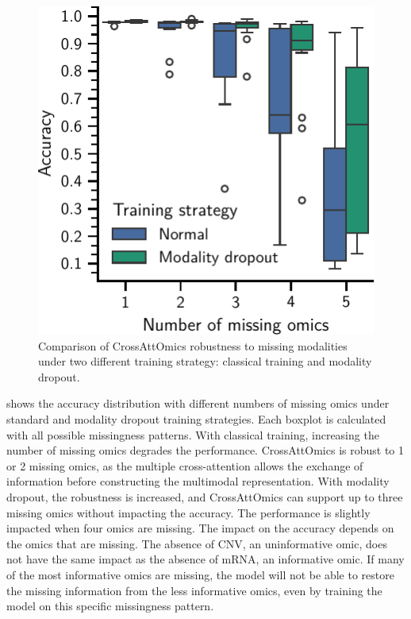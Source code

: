 \documentclass[../main.tex]{subfiles}
\begin{document}
		\begin{figure}
			\centering
			\includegraphics{robustness_missing_modalities_dropout.pdf}
			\caption[CrossAttOmics robustness to missing modalities]{Comparison of CrossAttOmics robustness to missing modalities under two different training strategy: classical training and modality dropout.}\label{fig:modality_dropout}
		\end{figure}
		 shows the accuracy distribution with different numbers of missing omics under standard and modality dropout training strategies.
		Each boxplot is calculated with all possible missingness patterns.
		With classical training, increasing the number of missing omics degrades the performance.
		CrossAttOmics is robust to 1 or 2 missing omics, as the multiple cross-attention allows the exchange of information before constructing the multimodal representation.
		With modality dropout, the robustness is increased, and CrossAttOmics can support up to three missing omics without impacting the accuracy.
		The performance is slightly impacted when four omics are missing.
		The impact on the accuracy depends on the omics that are missing.
		The absence of CNV, an uninformative omic, does not have the same impact as the absence of mRNA, an informative omic.
		If many of the most informative omics are missing, the model will not be able to restore the missing information from the less informative omics, even by training the model on this specific missingness pattern.
\end{document}
